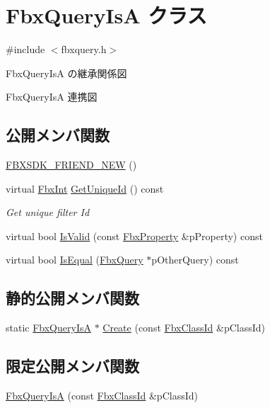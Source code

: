 \hypertarget{class_fbx_query_is_a}{}\section{Fbx\+Query\+IsA クラス}
\label{class_fbx_query_is_a}


{\ttfamily \#include $<$fbxquery.\+h$>$}



Fbx\+Query\+IsA の継承関係図


Fbx\+Query\+IsA 連携図
\subsection*{公開メンバ関数}
\begin{DoxyCompactItemize}
\item 
\hyperlink{class_fbx_query_is_a_a07dda20fad6d4ede4d322dd71e54a67a}{F\+B\+X\+S\+D\+K\+\_\+\+F\+R\+I\+E\+N\+D\+\_\+\+N\+EW} ()
\item 
virtual \hyperlink{fbxtypes_8h_a088fa96de3b0b3ea69f0f6afef525dfb}{Fbx\+Int} \hyperlink{class_fbx_query_is_a_acf42ad6bd28bf6543ab09642561ee73b}{Get\+Unique\+Id} () const
\begin{DoxyCompactList}\small\item\em Get unique filter Id \end{DoxyCompactList}\item 
virtual bool \hyperlink{class_fbx_query_is_a_a6d3da2f05ab6e50346af8e9713168772}{Is\+Valid} (const \hyperlink{class_fbx_property}{Fbx\+Property} \&p\+Property) const
\item 
virtual bool \hyperlink{class_fbx_query_is_a_a49b41a34152be44240671b8ae59a4d19}{Is\+Equal} (\hyperlink{class_fbx_query}{Fbx\+Query} $\ast$p\+Other\+Query) const
\end{DoxyCompactItemize}
\subsection*{静的公開メンバ関数}
\begin{DoxyCompactItemize}
\item 
static \hyperlink{class_fbx_query_is_a}{Fbx\+Query\+IsA} $\ast$ \hyperlink{class_fbx_query_is_a_a2f148f1f0d2ef5eb863d091d65a25de8}{Create} (const \hyperlink{class_fbx_class_id}{Fbx\+Class\+Id} \&p\+Class\+Id)
\end{DoxyCompactItemize}
\subsection*{限定公開メンバ関数}
\begin{DoxyCompactItemize}
\item 
\hyperlink{class_fbx_query_is_a_a0eff5ab3ec51aefb9c37cf8b0b06ae23}{Fbx\+Query\+IsA} (const \hyperlink{class_fbx_class_id}{Fbx\+Class\+Id} \&p\+Class\+Id)
\end{DoxyCompactItemize}


